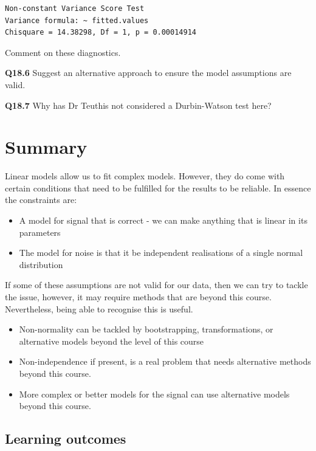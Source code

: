 \documentclass[
  oneside]{krantz}
\providecommand{\tightlist}{%
  \setlength{\itemsep}{0pt}\setlength{\parskip}{0pt}}
\begin{document}
\begin{verbatim}
Non-constant Variance Score Test 
Variance formula: ~ fitted.values 
Chisquare = 14.38298, Df = 1, p = 0.00014914
\end{verbatim}

Comment on these diagnostics.

\textbf{Q18.6} Suggest an alternative approach to ensure the model assumptions are valid.

\textbf{Q18.7} Why has Dr Teuthis not considered a Durbin-Watson test here?

\hypertarget{SUMdiag}{%
\section{Summary}\label{SUMdiag}}

Linear models allow us to fit complex models. However, they do come with certain conditions that need to be fulfilled for the results to be reliable. In essence the constraints are:

\begin{itemize}
\tightlist
\item
  A model for signal that is correct - we can make anything that is linear in its parameters
\item
  The model for noise is that it be independent realisations of a single normal distribution
\end{itemize}

If some of these assumptions are not valid for our data, then we can try to tackle the issue, however, it may require methods that are beyond this course. Nevertheless, being able to recognise this is useful.

\begin{itemize}
\item
  Non-normality can be tackled by bootstrapping, transformations, or alternative models beyond the level of this course
\item
  Non-independence if present, is a real problem that needs alternative methods beyond this course.
\item
  More complex or better models for the signal can use alternative models beyond this course.
\end{itemize}

\hypertarget{learning-outcomes-10}{%
\subsection{Learning outcomes}\label{learning-outcomes-10}}
\end{document}
